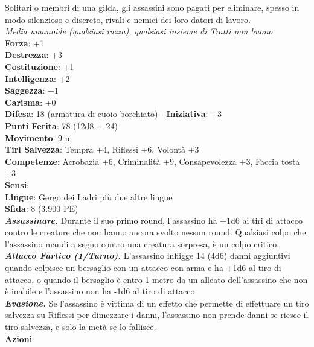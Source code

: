 \begin{multicols}{2}
Solitari o membri di una gilda, gli assassini sono pagati per eliminare, spesso in modo silenzioso e discreto, rivali e nemici dei loro datori di lavoro.\\
\emph{Media umanoide (qualsiasi razza), qualsiasi insieme di Tratti non buono}\\
\textbf{Forza}: +1\\
\textbf{Destrezza}: +3\\
\textbf{Costituzione}: +1\\
\textbf{Intelligenza}: +2\\
\textbf{Saggezza}: +1\\
\textbf{Carisma}: +0\\
\textbf{Difesa}: 18 (armatura di cuoio borchiato) - \textbf{Iniziativa}: +3\\
\textbf{Punti Ferita}: 78 (12d8 + 24)\\
\textbf{Movimento}: 9 m\\
\textbf{Tiri Salvezza}: Tempra +4, Riflessi +6, Volontà +3 \\
\textbf{Competenze}: Acrobazia +6, Criminalità +9, Consapevolezza +3, Faccia tosta +3\\
\textbf{Sensi}: \\
\textbf{Lingue}: Gergo dei Ladri più due altre lingue\\
\textbf{Sfida}: 8 (3.900 PE)\smallskip\\

\emph{\textbf{Assassinare.}} Durante il suo primo round, l'assassino ha +1d6 ai tiri di attacco contro le creature che non hanno ancora svolto nessun round. Qualsiasi colpo che l'assassino mandi a segno contro una creatura sorpresa, è un colpo critico.\\

\emph{\textbf{Attacco Furtivo (1/Turno).}} L'assassino infligge 14 (4d6) danni aggiuntivi quando colpisce un bersaglio con un attacco con arma e ha +1d6 al tiro di attacco, o quando il bersaglio è entro 1 metro da un alleato dell'assassino che non è inabile e l'assassino non ha -1d6 al tiro di attacco.\\

\emph{\textbf{Evasione.}} Se l'assassino è vittima di un effetto che permette di effettuare un tiro salvezza su Riflessi per dimezzare i danni, l'assassino non prende danni se riesce il tiro salvezza, e solo la metà se lo fallisce.\\

\smallskip\textbf{Azioni}\\


\end{multicols}
